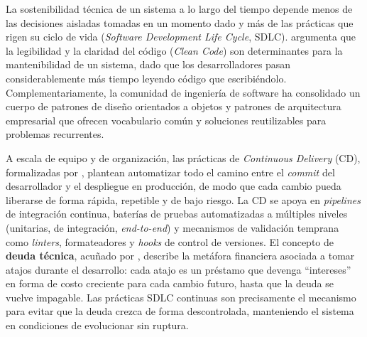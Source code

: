 La sostenibilidad técnica de un sistema a lo largo del tiempo depende menos de las decisiones aisladas tomadas en un momento dado y más de las prácticas que rigen su ciclo de vida (\textit{Software Development Life Cycle}, SDLC). \textcite{Martin2008} argumenta que la legibilidad y la claridad del código (\textit{Clean Code}) son determinantes para la mantenibilidad de un sistema, dado que los desarrolladores pasan considerablemente más tiempo leyendo código que escribiéndolo. Complementariamente, la comunidad de ingeniería de software ha consolidado un cuerpo de patrones de diseño orientados a objetos \cite{Gamma1994} y patrones de arquitectura empresarial \cite{Fowler2002} que ofrecen vocabulario común y soluciones reutilizables para problemas recurrentes.

A escala de equipo y de organización, las prácticas de \textit{Continuous Delivery} (CD), formalizadas por \textcite{Humble2010}, plantean automatizar todo el camino entre el \textit{commit} del desarrollador y el despliegue en producción, de modo que cada cambio pueda liberarse de forma rápida, repetible y de bajo riesgo. La CD se apoya en \textit{pipelines} de integración continua, baterías de pruebas automatizadas a múltiples niveles (unitarias, de integración, \textit{end-to-end}) y mecanismos de validación temprana como \textit{linters}, formateadores y \textit{hooks} de control de versiones. El concepto de \textbf{deuda técnica}, acuñado por \textcite{Cunningham1992}, describe la metáfora financiera asociada a tomar atajos durante el desarrollo: cada atajo es un préstamo que devenga ``intereses'' en forma de costo creciente para cada cambio futuro, hasta que la deuda se vuelve impagable. Las prácticas SDLC continuas son precisamente el mecanismo para evitar que la deuda crezca de forma descontrolada, manteniendo el sistema en condiciones de evolucionar sin ruptura.
